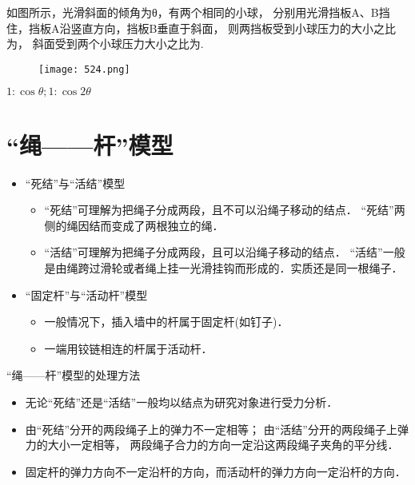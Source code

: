 \documentclass[cn,11pt]{elegantbook}
\begin{document}
   
   \begin{example}
      如图所示，光滑斜面的倾角为θ，有两个相同的小球，
      分别用光滑挡板A、B挡住，挡板A沿竖直方向，挡板B垂直于斜面，
      则两挡板受到小球压力的大小之比为，
      斜面受到两个小球压力大小之比为.      
      \begin{figure}[H]
         \centering
         \texttt{[image: 524.png]}
      \end{figure}

      \begin{solution}
         $1:\cos\theta;         1:\cos2\theta$
      \end{solution}

      
                  
      
   \end{example}

   \newpage\section{“绳——杆”模型}
   \begin{itemize}
      \item “死结”与“活结”模型
      \begin{itemize}
         \item “死结”可理解为把绳子分成两段，且不可以沿绳子移动的结点．
         “死结”两侧的绳因结而变成了两根独立的绳．
         \item “活结”可理解为把绳子分成两段，且可以沿绳子移动的结点．
         “活结”一般是由绳跨过滑轮或者绳上挂一光滑挂钩而形成的．实质还是同一根绳子．
      \end{itemize}
      \item “固定杆”与“活动杆”模型
      \begin{itemize}
         \item 一般情况下，插入墙中的杆属于固定杆(如钉子)．
         \item 一端用铰链相连的杆属于活动杆．
      \end{itemize}
   \end{itemize}

   \begin{note}
      “绳——杆”模型的处理方法
      \begin{itemize}
         \item 无论“死结”还是“活结”一般均以结点为研究对象进行受力分析．
         \item 由“死结”分开的两段绳子上的弹力不一定相等；
         由“活结”分开的两段绳子上弹力的大小一定相等，
         两段绳子合力的方向一定沿这两段绳子夹角的平分线．
         \item 固定杆的弹力方向不一定沿杆的方向，而活动杆的弹力方向一定沿杆的方向．
      \end{itemize}   
   \end{note}
\end{document}
